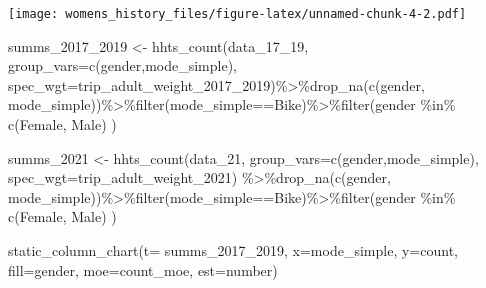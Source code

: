 \documentclass[
  12pt,
]{article}
\newenvironment{Shaded}{\begin{snugshade}}{\end{snugshade}}
\newcommand{\AttributeTok}[1]{\textcolor[rgb]{0.77,0.63,0.00}{#1}}
\newcommand{\FunctionTok}[1]{\textcolor[rgb]{0.00,0.00,0.00}{#1}}
\newcommand{\NormalTok}[1]{#1}
\newcommand{\OtherTok}[1]{\textcolor[rgb]{0.56,0.35,0.01}{#1}}
\newcommand{\SpecialCharTok}[1]{\textcolor[rgb]{0.00,0.00,0.00}{#1}}
\newcommand{\StringTok}[1]{\textcolor[rgb]{0.31,0.60,0.02}{#1}}
\begin{document}
\texttt{[image: womens\_history\_files/figure-latex/unnamed-chunk-4-2.pdf]}

\begin{Shaded}
\begin{Highlighting}[]
\NormalTok{  summs\_2017\_2019 }\OtherTok{\textless{}{-}} \FunctionTok{hhts\_count}\NormalTok{(data\_17\_19,}
                                        \AttributeTok{group\_vars=}\FunctionTok{c}\NormalTok{(}\StringTok{\textquotesingle{}gender\textquotesingle{}}\NormalTok{,}\StringTok{\textquotesingle{}mode\_simple\textquotesingle{}}\NormalTok{),}
                                        \AttributeTok{spec\_wgt=}\StringTok{\textquotesingle{}trip\_adult\_weight\_2017\_2019\textquotesingle{}}\NormalTok{)}\SpecialCharTok{\%\textgreater{}\%}\FunctionTok{drop\_na}\NormalTok{(}\FunctionTok{c}\NormalTok{(}\StringTok{\textquotesingle{}gender\textquotesingle{}}\NormalTok{, }\StringTok{\textquotesingle{}mode\_simple\textquotesingle{}}\NormalTok{))}\SpecialCharTok{\%\textgreater{}\%}\FunctionTok{filter}\NormalTok{(mode\_simple}\SpecialCharTok{==}\StringTok{\textquotesingle{}Bike\textquotesingle{}}\NormalTok{)}\SpecialCharTok{\%\textgreater{}\%}\FunctionTok{filter}\NormalTok{(gender }\SpecialCharTok{\%in\%} \FunctionTok{c}\NormalTok{(}\StringTok{\textquotesingle{}Female\textquotesingle{}}\NormalTok{, }\StringTok{\textquotesingle{}Male\textquotesingle{}}\NormalTok{) )}

\NormalTok{  summs\_2021 }\OtherTok{\textless{}{-}} \FunctionTok{hhts\_count}\NormalTok{(data\_21,}
                                   \AttributeTok{group\_vars=}\FunctionTok{c}\NormalTok{(}\StringTok{\textquotesingle{}gender\textquotesingle{}}\NormalTok{,}\StringTok{\textquotesingle{}mode\_simple\textquotesingle{}}\NormalTok{),}
                                   \AttributeTok{spec\_wgt=}\StringTok{\textquotesingle{}trip\_adult\_weight\_2021\textquotesingle{}}\NormalTok{) }\SpecialCharTok{\%\textgreater{}\%}\FunctionTok{drop\_na}\NormalTok{(}\FunctionTok{c}\NormalTok{(}\StringTok{\textquotesingle{}gender\textquotesingle{}}\NormalTok{, }\StringTok{\textquotesingle{}mode\_simple\textquotesingle{}}\NormalTok{))}\SpecialCharTok{\%\textgreater{}\%}\FunctionTok{filter}\NormalTok{(mode\_simple}\SpecialCharTok{==}\StringTok{\textquotesingle{}Bike\textquotesingle{}}\NormalTok{)}\SpecialCharTok{\%\textgreater{}\%}\FunctionTok{filter}\NormalTok{(gender }\SpecialCharTok{\%in\%} \FunctionTok{c}\NormalTok{(}\StringTok{\textquotesingle{}Female\textquotesingle{}}\NormalTok{, }\StringTok{\textquotesingle{}Male\textquotesingle{}}\NormalTok{) )}
  
 

\FunctionTok{static\_column\_chart}\NormalTok{(}\AttributeTok{t=}\NormalTok{ summs\_2017\_2019, }\AttributeTok{x=}\StringTok{\textquotesingle{}mode\_simple\textquotesingle{}}\NormalTok{, }\AttributeTok{y=}\StringTok{\textquotesingle{}count\textquotesingle{}}\NormalTok{,  }\AttributeTok{fill=}\StringTok{\textquotesingle{}gender\textquotesingle{}}\NormalTok{, }\AttributeTok{moe=}\StringTok{\textquotesingle{}count\_moe\textquotesingle{}}\NormalTok{, }\AttributeTok{est=}\StringTok{\textquotesingle{}number\textquotesingle{}}\NormalTok{)}
\end{Highlighting}
\end{Shaded}
\end{document}

